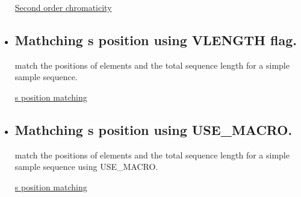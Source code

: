 \begin{itemize}
\href{http://cern.ch/madx/madX/examples/match/lhc.qpp/job.lhc.qpp.madx}{Second order chromaticity}
	
	\item \subsection{Mathching s position using VLENGTH flag.}
	match the positions of elements and the total sequence length for a simple sample sequence. 

\href{http://cern.ch/madx/madX/examples/match/s-match/job.s-match.madx}{s position matching}
	
	\item \subsection{Mathching s position using USE\_MACRO.}
	match the positions of elements and the total sequence length for a simple sample sequence using USE\_MACRO. 

\href{http://cern.ch/madx/madX/examples/match/s-match-usemacro/job.s-match-usemacro.madx}{s position matching}

\end{itemize}

